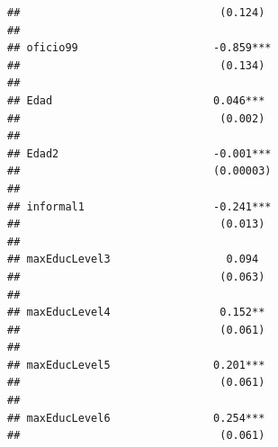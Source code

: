 \documentclass[
]{article}
\begin{document}
\begin{verbatim}
##                               (0.124)                                                               
##                                                                                                     
## oficio99                     -0.859***                                                              
##                               (0.134)                                                               
##                                                                                                     
## Edad                         0.046***                                                               
##                               (0.002)                                                               
##                                                                                                     
## Edad2                        -0.001***                                                              
##                              (0.00003)                                                              
##                                                                                                     
## informal1                    -0.241***                                                              
##                               (0.013)                                                               
##                                                                                                     
## maxEducLevel3                  0.094                                                                
##                               (0.063)                                                               
##                                                                                                     
## maxEducLevel4                 0.152**                                                               
##                               (0.061)                                                               
##                                                                                                     
## maxEducLevel5                0.201***                                                               
##                               (0.061)                                                               
##                                                                                                     
## maxEducLevel6                0.254***                                                               
##                               (0.061)                                                               

\end{verbatim}
\end{document}
